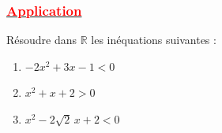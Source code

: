 \documentclass[12pt,a4paper]{article}
\begin{document}
\subsubsection*{\underline{\textcolor{red}{Application}}}

Résoudre dans $\mathbb{R}$ les inéquations suivantes :

\begin{enumerate}

\item $-2x^2 + 3x - 1 < 0$



\item $x^2 + x + 2 > 0$



\item $x^2 - 2\sqrt{2}\,x + 2 < 0$


\end{enumerate}
\end{document}

